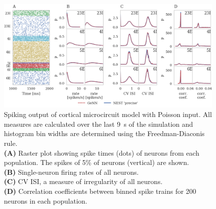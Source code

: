 \documentclass[utf8]{frontiersSCNS} %
\begin{document}
\begin{figure}
    \begin{center}
        \includegraphics[width=180mm]{figures/microcircuit_accuracy}
    \end{center}
    \caption{Spiking output of cortical microcircuit model with Poisson input.
    All measures are calculated over the last \SI{9}{\second} of the simulation and histogram bin widths are determined using the Freedman-Diaconis rule.\\
    \textbf{(A)} Raster plot showing spike times (dots) of neurons from each population.
    The spikes of 5\% of neurons (vertical) are shown.\\
    \textbf{(B)} Single-neuron firing rates of all neurons.\\
    \textbf{(C)} CV ISI, a measure of irregularity of all neurons.\\
    \textbf{(D)} Correlation coefficients between binned spike trains for \num{200} neurons in each population.}
    \label{fig:microcircuit_accuracy}
\end{figure}
\end{document}

